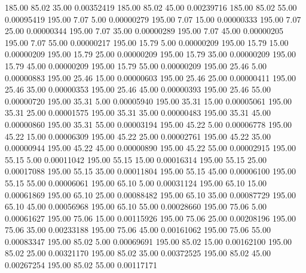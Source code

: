     185.00     85.02     35.00     0.00352419
    185.00     85.02     45.00     0.00239716
    185.00     85.02     55.00     0.00095419
    195.00      7.07      5.00     0.00000279
    195.00      7.07     15.00     0.00000333
    195.00      7.07     25.00     0.00000344
    195.00      7.07     35.00     0.00000289
    195.00      7.07     45.00     0.00000205
    195.00      7.07     55.00     0.00000217
    195.00     15.79      5.00     0.00000209
    195.00     15.79     15.00     0.00000209
    195.00     15.79     25.00     0.00000209
    195.00     15.79     35.00     0.00000209
    195.00     15.79     45.00     0.00000209
    195.00     15.79     55.00     0.00000209
    195.00     25.46      5.00     0.00000883
    195.00     25.46     15.00     0.00000603
    195.00     25.46     25.00     0.00000411
    195.00     25.46     35.00     0.00000353
    195.00     25.46     45.00     0.00000393
    195.00     25.46     55.00     0.00000720
    195.00     35.31      5.00     0.00005940
    195.00     35.31     15.00     0.00005061
    195.00     35.31     25.00     0.00001575
    195.00     35.31     35.00     0.00000483
    195.00     35.31     45.00     0.00000860
    195.00     35.31     55.00     0.00003194
    195.00     45.22      5.00     0.00006778
    195.00     45.22     15.00     0.00006309
    195.00     45.22     25.00     0.00002761
    195.00     45.22     35.00     0.00000944
    195.00     45.22     45.00     0.00000890
    195.00     45.22     55.00     0.00002915
    195.00     55.15      5.00     0.00011042
    195.00     55.15     15.00     0.00016314
    195.00     55.15     25.00     0.00017088
    195.00     55.15     35.00     0.00011804
    195.00     55.15     45.00     0.00006100
    195.00     55.15     55.00     0.00006061
    195.00     65.10      5.00     0.00031124
    195.00     65.10     15.00     0.00061869
    195.00     65.10     25.00     0.00088482
    195.00     65.10     35.00     0.00087729
    195.00     65.10     45.00     0.00056968
    195.00     65.10     55.00     0.00028660
    195.00     75.06      5.00     0.00061627
    195.00     75.06     15.00     0.00115926
    195.00     75.06     25.00     0.00208196
    195.00     75.06     35.00     0.00233188
    195.00     75.06     45.00     0.00161062
    195.00     75.06     55.00     0.00083347
    195.00     85.02      5.00     0.00069691
    195.00     85.02     15.00     0.00162100
    195.00     85.02     25.00     0.00321170
    195.00     85.02     35.00     0.00372525
    195.00     85.02     45.00     0.00267254
    195.00     85.02     55.00     0.00117171
